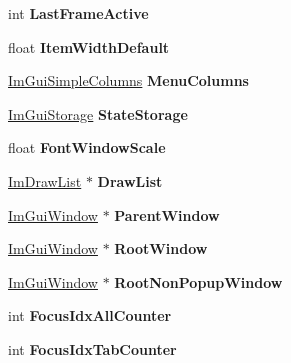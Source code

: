 \begin{DoxyCompactItemize}
int {\bfseries Last\+Frame\+Active}
\item 
\mbox{\label{struct_im_gui_window_a5e6be361ee0c71a22a1ff68f6dbf09ff}} 
float {\bfseries Item\+Width\+Default}
\item 
\mbox{\label{struct_im_gui_window_a9207bb87da58863ce60c08679ef19977}} 
\hyperlink{struct_im_gui_simple_columns}{Im\+Gui\+Simple\+Columns} {\bfseries Menu\+Columns}
\item 
\mbox{\label{struct_im_gui_window_a2151ab67f2624bd606883ad346179486}} 
\hyperlink{struct_im_gui_storage}{Im\+Gui\+Storage} {\bfseries State\+Storage}
\item 
\mbox{\label{struct_im_gui_window_a566ce9268a466afbbec78532d5cfa3c9}} 
float {\bfseries Font\+Window\+Scale}
\item 
\mbox{\label{struct_im_gui_window_a39de4668b09754136c6fd7ab89ab674a}} 
\hyperlink{struct_im_draw_list}{Im\+Draw\+List} $\ast$ {\bfseries Draw\+List}
\item 
\mbox{\label{struct_im_gui_window_a5f0b37cb12fbeb3efe00d0cd826d5d65}} 
\hyperlink{struct_im_gui_window}{Im\+Gui\+Window} $\ast$ {\bfseries Parent\+Window}
\item 
\mbox{\label{struct_im_gui_window_aef9281297b0993c8f1b7c1ff7987cb61}} 
\hyperlink{struct_im_gui_window}{Im\+Gui\+Window} $\ast$ {\bfseries Root\+Window}
\item 
\mbox{\label{struct_im_gui_window_a43b1e2ffa15d572f4d0ce4fbbeb5595f}} 
\hyperlink{struct_im_gui_window}{Im\+Gui\+Window} $\ast$ {\bfseries Root\+Non\+Popup\+Window}
\item 
\mbox{\label{struct_im_gui_window_a51ee526aed5b993e0a849f2db1fdc4dc}} 
int {\bfseries Focus\+Idx\+All\+Counter}
\item 
\mbox{\label{struct_im_gui_window_a7e3e75ec3d66d04801bfffdd02643d3c}} 
int {\bfseries Focus\+Idx\+Tab\+Counter}
\item 

\end{DoxyCompactItemize}
